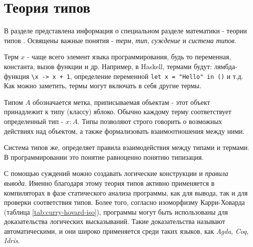 \chapter{Теория типов}
\label{ch:type_theory}

В разделе представлена информация о специальном разделе математики - теории типов \cite{TypeTheoryBook}.
Освящены важные понятия - \textit{терм}, \textit{тип}, \textit{суждение} и \textit{система типов}.

Терм $x$ - чаще всего элемент языка программирования, будь то переменная, константа, вызов функции и др.
Например, в Haskell, термами будут: лямбда-функция \lstinline{\x -> x + 1}, определение переменной \lstinline{let x = "Hello" in ()} и т.д.
Как можно заметить, термы могут включать в себя другие термы.

Типом $A$ обозначается метка, приписываемая объектам - этот объект принадлежит к типу (классу) яблоко.
Обычно каждому терму соответствует определенный тип - $x: A$.
Типы позволяют строго говорить о возможных действиях над объектом, а также формализовать взаимоотношения между ними.

Система типов же, определяет правила взаимодействия между типами и термами.
В программировании это понятие равноценно понятию типизация.

С помощью суждений можно создавать логические конструкции и \textit{правила вывода}.
Именно благодаря этому теория типов активно применяется в компиляторах в фазе статического анализа программы, как для вывода, так и для проверки соответствия типов.
Более того, согласно изоморфизму Карри-Ховарда \cite{TypeTheoryArticle} (таблица \ref{tab:curry-hovard-iso}), программы могут быть использованы для доказательства логических высказываний.
Такие доказательства называют автоматическими, и они широко применяется среди таких языков, как \textit{Agda}, \textit{Coq}, \textit{Idris}.

